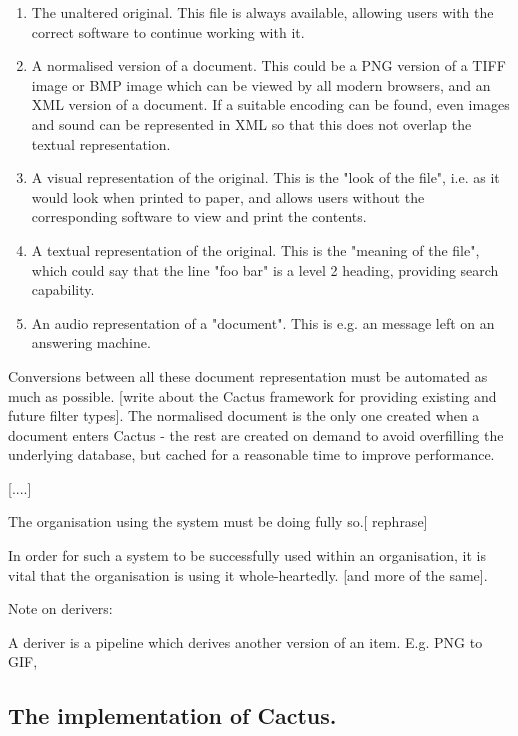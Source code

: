 \begin{enumerate}
\item The unaltered original.  This file is always
  available, allowing users with the correct software to
  continue working with it.
  
\item A normalised version of a document.  This could be a
  PNG version of a TIFF image or BMP image which can be
  viewed by all modern browsers, and an XML version of a
  document.  If a suitable encoding can be found, even
  images and sound can be represented in XML so that this
  does not overlap the textual representation.
  
\item A visual representation of the original.  This is the
  "look of the file", i.e. as it would look when printed to
  paper, and allows users without the corresponding software
  to view and print the contents.
  
\item A textual representation of the original.  This is the
  "meaning of the file", which could say that the line "foo
  bar" is a level 2 heading, providing search capability.

  
\item An audio representation of a "document".  This is e.g.
  an message left on an answering machine.
\end{enumerate}

Conversions between all these document representation must
be automated as much as possible.  [write about the Cactus
framework for providing existing and future filter types].
The normalised document is the only one created when a
document enters Cactus - the rest are created on demand to
avoid overfilling the underlying database, but cached for a
reasonable time to improve performance.

[....]


The organisation using the system must be doing fully so.[
rephrase]

In order for such a system to be successfully used within an
organisation, it is vital that the organisation is using it
whole-heartedly.  [and more of the same].


Note on derivers:

A deriver is a pipeline which derives another version of an
item.  E.g. PNG to GIF,

\subsection{The implementation of Cactus.}



